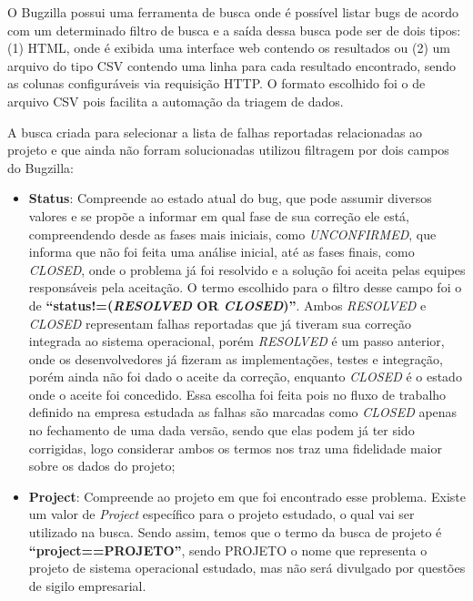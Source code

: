 \documentclass[11.5pt]{article}
\begin{document}
O Bugzilla possui uma ferramenta de busca onde é possível listar bugs de acordo com um determinado
filtro de busca e a saída dessa busca pode ser de dois tipos: (1) HTML, onde é exibida uma interface
web contendo os resultados ou
(2) um arquivo do tipo CSV contendo uma linha para cada resultado encontrado, sendo as colunas
configuráveis via requisição HTTP.
O formato escolhido foi o de arquivo CSV pois facilita a automação da triagem de dados.

A busca criada para selecionar a lista de falhas reportadas relacionadas ao projeto e que ainda não
forram solucionadas utilizou filtragem por dois campos do Bugzilla:

\begin{itemize}
    \item \textbf{Status}: Compreende ao estado atual do bug, que pode assumir diversos valores e
          se propõe a informar em qual fase de sua correção ele está, compreendendo desde as fases
          mais iniciais, como \textit{UNCONFIRMED}, que informa que não foi feita uma análise
          inicial, até as fases finais, como \textit{CLOSED}, onde o problema já foi resolvido e
          a solução foi aceita pelas equipes responsáveis pela aceitação.
          O termo escolhido para o filtro desse campo foi o de
          \textbf{``status!=(\textit{RESOLVED} OR \textit{CLOSED})''}.
          Ambos \textit{RESOLVED} e \textit{CLOSED} representam falhas reportadas que já tiveram sua
          correção integrada ao sistema operacional, porém \textit{RESOLVED} é um passo anterior,
          onde os desenvolvedores já fizeram as implementações, testes e integração, porém ainda
          não foi dado o aceite da correção, enquanto \textit{CLOSED} é o estado onde o aceite foi
          concedido.
          Essa escolha foi feita pois no fluxo de trabalho definido na empresa estudada as falhas
          são marcadas como \textit{CLOSED} apenas no fechamento de uma dada versão, sendo que elas
          podem já ter sido corrigidas, logo considerar ambos os termos nos traz uma fidelidade
          maior sobre os dados do projeto;

    \item \textbf{Project}: Compreende ao projeto em que foi encontrado esse problema. Existe um
          valor de \textit{Project} específico para o projeto estudado, o qual vai ser utilizado na
          busca. Sendo assim, temos que o termo da busca de projeto é
          \textbf{``project==PROJETO''}, sendo PROJETO o nome que representa o projeto de sistema
          operacional estudado, mas não será divulgado por questões de sigilo empresarial.
\end{itemize}
\end{document}
